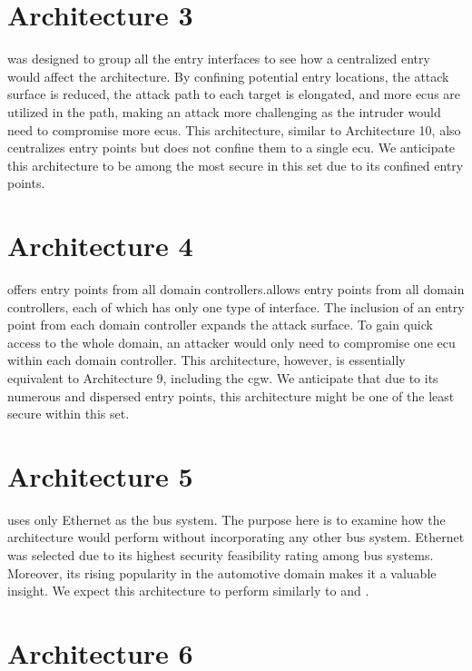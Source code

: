 \section{Architecture 3}
\label{subsec:arch3}

 was designed to group all the entry interfaces to see how a centralized entry would affect the architecture. 
By confining potential entry locations, the attack surface is reduced, the attack path to each target is elongated, 
and more \acrshort{ecu}s are utilized in the path, making an attack more challenging as the intruder would need to compromise more \acrshort{ecu}s. 
This architecture, similar to Architecture 10, also centralizes entry points but does not confine them to a single \acrshort{ecu}.
We anticipate this architecture to be among the most secure in this set due to its confined entry points.
\section{Architecture 4}
\label{subsec:arch4}

 offers entry points from all domain controllers.allows entry points from all domain controllers, 
each of which has only one type of interface. The inclusion of an entry point from each domain controller expands the attack surface. 
To gain quick access to the whole domain, an attacker would only need to compromise one \acrshort{ecu} within each domain controller. 
This architecture, however, is essentially equivalent to Architecture 9, including the \acrshort{cgw}. 
We anticipate that due to its numerous and dispersed entry points, this architecture might be one of the least secure within this set.
\section{Architecture 5}
\label{subsec:arch5}

 uses only Ethernet as the bus system. 
The purpose here is to examine how the architecture would perform without incorporating any other bus system. 
Ethernet was selected due to its highest security feasibility rating among bus systems. 
Moreover, its rising popularity in the automotive domain makes it a valuable insight.
We expect this architecture to perform similarly to  and .

\section{Architecture 6}
\label{subsec:arch6}

